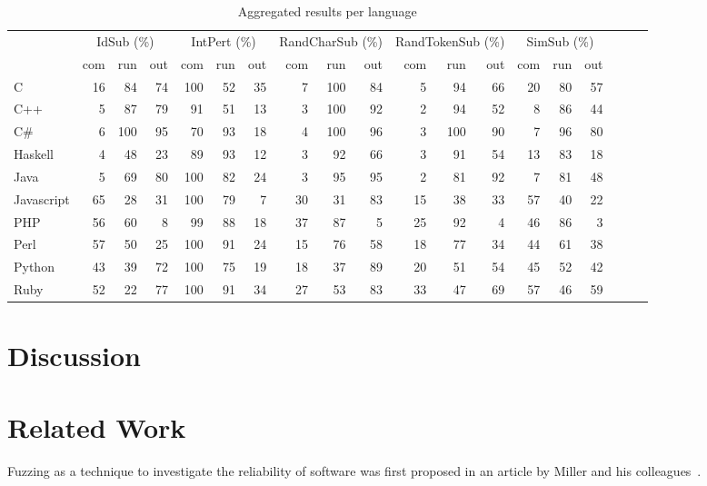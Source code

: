 \documentclass[10pt]{sigplanconf}
\begin{document}
\begin{table*}
\begin{center}
\begin{tabular}{ l r r r r r r r r r r r r r r r r r r }
 \hline
 & \multicolumn{3}{c}{IdSub (\%)} & \multicolumn{3}{c}{IntPert (\%)} & \multicolumn{3}{c}{RandCharSub (\%)} & \multicolumn{3}{c}{RandTokenSub (\%)} & \multicolumn{3}{c}{SimSub (\%)}\\
 & com & run & out & com & run & out & com & run & out & com & run & out & com & run & out\\
\hline
C & 16 & 84 & 74 & 100 & 52 & 35 & 7 & 100 & 84 & 5 & 94 & 66 & 20 & 80 & 57 \\
C++ & 5 & 87 & 79 & 91 & 51 & 13 & 3 & 100 & 92 & 2 & 94 & 52 & 8 & 86 & 44 \\
C\# & 6 & 100 & 95 & 70 & 93 & 18 & 4 & 100 & 96 & 3 & 100 & 90 & 7 & 96 & 80 \\
Haskell & 4 & 48 & 23 & 89 & 93 & 12 & 3 & 92 & 66 & 3 & 91 & 54 & 13 & 83 & 18 \\
Java & 5 & 69 & 80 & 100 & 82 & 24 & 3 & 95 & 95 & 2 & 81 & 92 & 7 & 81 & 48 \\
Javascript & 65 & 28 & 31 & 100 & 79 & 7 & 30 & 31 & 83 & 15 & 38 & 33 & 57 & 40 & 22 \\
PHP & 56 & 60 & 8 & 99 & 88 & 18 & 37 & 87 & 5 & 25 & 92 & 4 & 46 & 86 & 3 \\
Perl & 57 & 50 & 25 & 100 & 91 & 24 & 15 & 76 & 58 & 18 & 77 & 34 & 44 & 61 & 38 \\
Python & 43 & 39 & 72 & 100 & 75 & 19 & 18 & 37 & 89 & 20 & 51 & 54 & 45 & 52 & 42 \\
Ruby & 52 & 22 & 77 & 100 & 91 & 34 & 27 & 53 & 83 & 33 & 47 & 69 & 57 & 46 & 59 \\
\hline
\end{tabular}
\end{center}
\caption{Aggregated results per language}
\label{tbl:aggregated-per-language}
\end{table*}

\section{Discussion} %
\label{sec:discussion}

\section{Related Work} %
\label{sec:related}

Fuzzing as a technique to investigate the reliability of software
was first proposed in an article by Miller and his colleagues~\cite{MFS90}.
\end{document}
